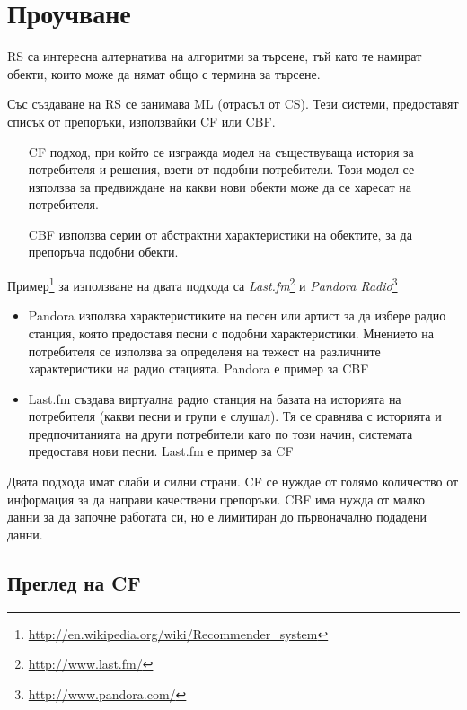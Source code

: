 \section{Проучване}

	\ac{RS} са интересна алтернатива на алгоритми за търсене, тъй като те намират обекти, които може да нямат общо с термина
	за търсене.

	Със създаване на \ac{RS} се занимава \ac{ML} (отрасъл от \ac{CS}). Тези системи, предоставят
	списък от препоръки, използвайки \ac{CF} или \ac{CBF}. 
	
	\begin{itemize}
	\item[\ac{CF}] подход, при който се изгражда модел на съществуваща история за потребителя и решения, взети от подобни потребители.
	Този модел се използва за предвиждане на какви нови обекти може да се харесат на потребителя.\cite{Melville}
	\item[\ac{CBF}] използва серии от абстрактни характеристики на обектите, за да препоръча подобни обекти.\cite{Mooney}
	\end{itemize}
	
	Пример\footnote{\url{http://en.wikipedia.org/wiki/Recommender_system}} за използване на двата подхода са 
  \emph{Last.fm}\footnote{\url{http://www.last.fm/}} и \emph{Pandora Radio}\footnote{\url{http://www.pandora.com/}}
  
  \begin{itemize}
		\item Pandora използва характеристиките на песен или артист за да избере радио станция, която предоставя песни с подобни характеристики. Мнението на потребителя се използва за определеня на тежест на различните характеристики на радио стацията. Pandora е пример за \ac{CBF}
		\item Last.fm създава виртуална радио станция на базата на историята на потребителя (какви песни и групи е слушал). Тя се сравнява с историята и предпочитанията на други потребители като по този начин, системата предоставя нови песни. Last.fm е пример за \ac{CF}
  \end{itemize}

	Двата подхода имат слаби и силни страни. \ac{CF} се нуждае от голямо количество от информация за да направи качествени препоръки. \ac{CBF} има нужда от малко данни за да започне работата си, но е лимитиран до първоначално подадени данни.
	
	\subsection{Преглед на \ac{CF}}
	
